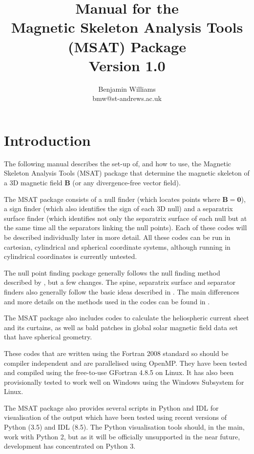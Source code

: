 \documentclass[12pt]{article}
\author{Benjamin Williams \\ bmw@st-andrews.ac.uk}
\title{Manual for the \\ Magnetic Skeleton Analysis Tools (MSAT) Package \\ \( \; \) \\ Version 1.0}
\renewcommand{\vec}[1]{\mathbf{#1}}
\begin{document}
  \maketitle

  \tableofcontents

  \newpage

  \section{Introduction}

    The following manual describes the set-up of, and how to use, the Magnetic Skeleton Analysis Tools (MSAT) package that determine the magnetic skeleton of a 3D magnetic field \( \vec{B} \) (or any divergence-free vector field).

    The MSAT package consists of a null finder (which locates points where \( \vec{B} = \vec{0} \)), a sign finder (which also identifies the sign of each 3D null) and a separatrix surface finder (which identifies not only the separatrix surface of each null but at the same time all the separators linking the null points). Each of these codes will be described individually later in more detail.  All these codes can be run in cartesian, cylindrical and spherical coordinate systems, although running in cylindrical coordinates is currently untested.

    The null point finding package generally follows the null finding method described by \cite{Haynes2007}, but a few changes. The spine, separatrix surface and separator finders also generally follow the basic ideas described in \cite{Haynes2007}. The main differences and more details on the methods used in the codes can be found in \cite{WilliamsPhD2018}.

    The MSAT package also includes codes to calculate the heliospheric current sheet and its curtains, as well as bald patches in global solar magnetic field data set that have spherical geometry.

    These codes that are written using the Fortran 2008 standard so should be compiler independent and are parallelised using OpenMP. They have been tested and compiled using the free-to-use GFortran 4.8.5 on Linux. It has also been provisionally tested to work well on Windows using the Windows Subsystem for Linux.

    The MSAT package also provides several scripts in Python and IDL for visualisation of the output which have been tested using recent versions of Python (3.5) and IDL (8.5). The Python visualisation tools should, in the main, work with Python 2, but as it will be officially unsupported in the near future, development has concentrated on Python 3.
\end{document}
